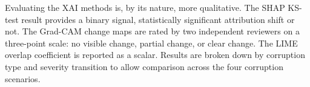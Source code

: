 Evaluating the XAI methods is, by its nature, more qualitative. The SHAP KS-test result provides a binary signal, statistically significant attribution shift or not. The Grad-CAM change maps are rated by two independent reviewers on a three-point scale: no visible change, partial change, or clear change. The LIME overlap coefficient is reported as a scalar. Results are broken down by corruption type and severity transition to allow comparison across the four corruption scenarios.
